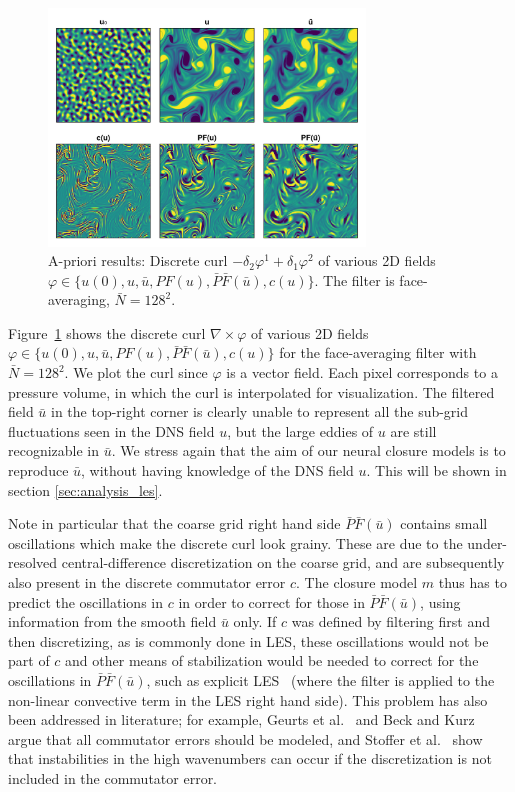 \documentclass[preprint]{elsarticle}
\begin{document}
\begin{figure}
    \centering
    \includegraphics[width=0.75\textwidth]{figures_prioranalysis_D=2_fields.png}
    \caption{
        A-priori results: Discrete curl $-\delta_2 \varphi^1 + \delta_1 \varphi^2$
        of various 2D fields $\varphi \in \{ u(0), u, \bar{u}, P F(u), \bar{P}
        \bar{F}(\bar{u}), c(u)\}$.
        The filter is face-averaging, $\bar{N} = 128^2$.
    }
    \label{fig:priorfields_2D}
\end{figure}

Figure~\ref{fig:priorfields_2D} shows the discrete curl
$\nabla \times \varphi$
of various 2D fields
$\varphi \in \{ u(0), u, \bar{u}, P F(u), \bar{P} \bar{F}(\bar{u}), c(u)\}$
for the face-averaging filter with $\bar{N} = 128^2$.
We plot the curl since $\varphi$ is a vector field. Each
pixel corresponds to a pressure volume, in which the curl is interpolated for
visualization. The filtered field $\bar{u}$ in the top-right corner is clearly
unable to represent all the sub-grid fluctuations seen in the DNS field $u$, but
the large eddies of $u$ are still recognizable in $\bar{u}$. We stress again
that the aim of our neural closure models is to reproduce $\bar{u}$, without
having knowledge of the DNS field $u$. This will be shown in section
\ref{sec:analysis_les}.

Note in particular that the coarse grid right hand side $\bar{P}
\bar{F}(\bar{u})$ contains small oscillations which make the discrete curl look
grainy. These are due to the under-resolved central-difference discretization on
the coarse grid, and are subsequently also present in the discrete commutator error
$c$. The closure model $m$ thus has to predict the oscillations in $c$ in order to
correct for those in $\bar{P} \bar{F}(\bar{u})$, using information from the
smooth field $\bar{u}$ only. If $c$ was defined by filtering first and then
discretizing, as is commonly done in LES, these oscillations would not be part
of $c$ and other means of stabilization would be needed to correct for the
oscillations in $\bar{P} \bar{F}(\bar{u})$, such as
explicit LES~\cite{Lund2003,Gallagher2019a,Benjamin2023b}
(where the filter is applied to
the non-linear convective term in the LES right hand side).
This problem has also been addressed in literature; for example,
Geurts et al.~\cite{Geurts2006} and Beck and Kurz~\cite{Beck2023} argue that all commutator
errors should be modeled, and Stoffer et al.~\cite{Stoffer2021} show that
instabilities in the high wavenumbers can occur if the discretization is not
included in the commutator error.
\end{document}
